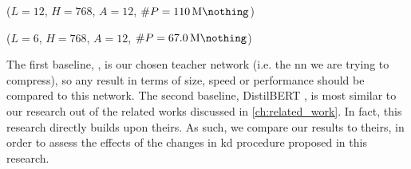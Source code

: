 \begin{description}
    \item \B{\bertbase} \citep{devlin2018bert} ($L=12$, $H=768$, $A=12$, $\#P=\SI{110}{\mega\nothing}$)
    \item {} \citep{sanh2019distilbert} ($L=6$, $H=768$, $A=12$, $\#P=\SI{67.0}{\mega\nothing}$)
\end{description}

The first baseline, \bertbase \citep{devlin2018bert}, is our chosen teacher network (i.e. the \gls{nn} we are trying to compress), so any result in terms of size, speed or performance should be compared to this network. The second baseline, DistilBERT \citep{sanh2019distilbert}, is most similar to our research out of the related works discussed in \cref{ch:related_work}. In fact, this research directly builds upon theirs. As such, we compare our results to theirs, in order to assess the effects of the changes in \gls{kd} procedure proposed in this research.
